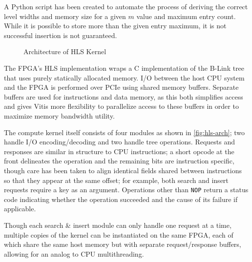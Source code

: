A Python script has been created to automate the process of deriving the correct
level widths and memory size for a given $m$ value and maximum entry count.
While it is possible to store more than the given entry maximum, it is not
successful insertion is not guaranteed.


\label{subsec:fpga-implementation}

\begin{figure}[H]
	\centering
	
	\caption{Architecture of HLS Kernel}
	\label{fig:hls-arch}
\end{figure}

The FPGA's HLS implementation wraps a C implementation of the B-Link tree that
uses purely statically allocated memory. I/O between the host CPU system and the
FPGA is performed over PCIe using shared memory buffers. Separate buffers are
used for instructions and data memory, as this both simplifies access and gives
Vitis more flexibility to parallelize access to these buffers in order to
maximize memory bandwidth utility.

The compute kernel itself consists of four modules as shown in
\autoref{fig:hls-arch}; two handle I/O encoding/decoding and two handle tree
operations. Requests and responses are similar in structure to CPU instructions;
a short opcode at the front delineates the operation and the remaining bits are
instruction specific, though care has been taken to align identical fields
shared between instructions so that they appear at the same offset; for example,
both search and insert requests require a key as an argument. Operations other
than \texttt{NOP} return a status code indicating whether the operation
succeeded and the cause of its failure if applicable.

Though each search \& insert module can only handle one request at a time,
multiple copies of the kernel can be instantiated on the same FPGA, each of
which share the same host memory but with separate request/response buffers,
allowing for an analog to CPU multithreading.
